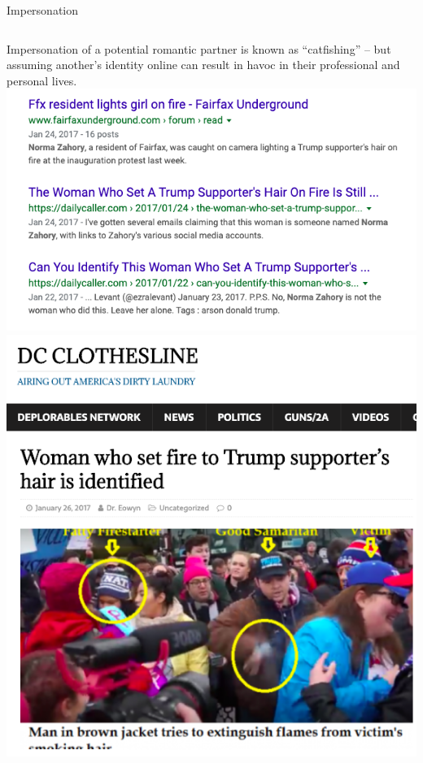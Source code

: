 \documentclass[nobackground,dvipsnames,table]{beamer}
\begin{document}
\begin{frame}{Impersonation}
    \begin{columns}
            \centering
            \small
            Impersonation of a potential romantic partner is known as “catfishing” -- but assuming another’s identity online can result in havoc in their professional and personal lives.
            \includegraphics[width=\textwidth]{hair-on-fire-search}
            \includegraphics[width=\textwidth]{hair-on-fire-article}
    \end{columns}
\end{frame}
\end{document}
